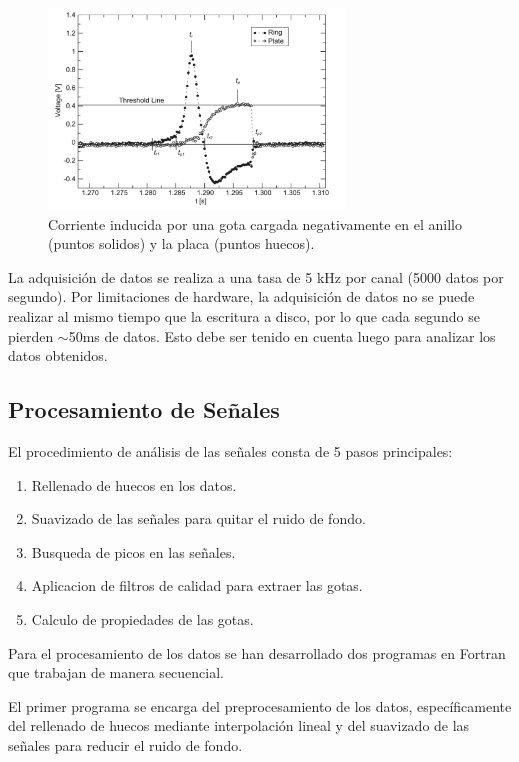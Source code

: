 \documentclass[12pt,a4paper]{article}
\begin{document}
\begin{figure}[!hb]
    \centering
    \includegraphics[width=0.7\textwidth]{figures/corriente_gotas.png}
    \caption{Corriente inducida por una gota cargada negativamente en el anillo (puntos solidos) y la placa (puntos huecos).}
    \label{fig:corriente_gotas}
\end{figure}

La adquisición de datos se realiza a una tasa de 5 kHz por canal (5000 datos por segundo). Por limitaciones de hardware, la adquisición de datos no se puede realizar al mismo tiempo que la escritura a disco, por lo que cada segundo se pierden $\sim$50ms de datos. Esto debe ser tenido en cuenta luego para analizar los datos obtenidos.

\subsection{Procesamiento de Señales}

El procedimiento de análisis de las señales consta de 5 pasos principales:

\begin{enumerate}
    \item Rellenado de huecos en los datos.
    \item Suavizado de las señales para quitar el ruido de fondo.
    \item Busqueda de picos en las señales.
    \item Aplicacion de filtros de calidad para extraer las gotas.
    \item Calculo de propiedades de las gotas.
\end{enumerate}

Para el procesamiento de los datos se han desarrollado dos programas en Fortran que trabajan de manera secuencial.

El primer programa se encarga del preprocesamiento de los datos, específicamente del rellenado de huecos mediante interpolación lineal y del suavizado de las señales para reducir el ruido de fondo.
\end{document}
